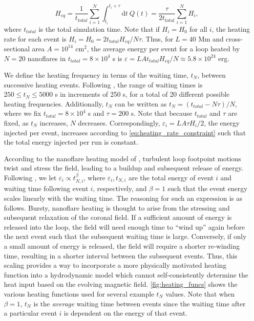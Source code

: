 \documentclass[preprint]{aastex}
\begin{document}
	\begin{equation}
		\label{eq:heating_rate_constraint}
		H_{eq} = \frac{1}{t_{total}}\sum_{i=1}^N\int_{t_i}^{t_i+\tau}\mathrm{d}t~Q(t) = \frac{\tau}{2t_{total}}\sum_{i=1}^NH_i,
	\end{equation}
	where $t_{total}$ is the total simulation time. Note that if $H_i=H_0$ for all $i$, the heating rate for each event is $H_i=H_0=2t_{total}H_{eq}/N\tau$. Thus, for $L=40$ Mm and cross-sectional area $A=10^{14}$ cm$^2$, the average energy per event for a loop heated by $N=20$ nanoflares in $t_{total}=8\times10^4$ s is $\varepsilon=LAt_{total}H_{eq}/N\approx5.8\times10^{24}$ erg.
	\par We define the heating frequency in terms of the waiting time, $t_N$, between successive heating events. Following \citet{cargill_active_2014}, the range of waiting times is $250\le t_N\le5000$ s in increments of 250 s, for a total of 20 different possible heating frequencies. Additionally, $t_N$ can be written as $t_N=(t_{total}-N\tau)/N$, where we fix $t_{total}=8\times10^4$ s and $\tau=200$ s. Note that because $t_{total}$ and $\tau$ are fixed, as $t_N$ increases, $N$ decreases. Correspondingly, $\varepsilon_i=LA\tau H_i/2$, the energy injected per event, increases according to \autoref{eq:heating_rate_constraint} such that the total energy injected per run is constant.
	\par According to the nanoflare heating model of \citet{parker_nanoflares_1988}, turbulent loop footpoint motions twist and stress the field, leading to a buildup and subsequent release of energy. Following \citet{cargill_active_2014}, we let $\varepsilon_i\propto t_{N,i}^{\beta}$, where $\varepsilon_i,t_{N,i}$ are the total energy of event $i$ and waiting time following event $i$, respectively, and $\beta=1$ such that the event energy scales linearly with the waiting time. The reasoning for such an expression is as follows. Bursty, nanoflare heating is thought to arise from the stressing and subsequent relaxation of the coronal field. If a sufficient amount of energy is released into the loop, the field will need enough time to ``wind up'' again before the next event such that the subsequent waiting time is large. Conversely, if only a small amount of energy is released, the field will require a shorter re-winding time, resulting in a shorter interval between the subsequent events. Thus, this scaling provides a way to incorporate a more physically motivated heating function into a hydrodynamic model which cannot self-consistently determine the heat input based on the evolving magnetic field. \autoref{fig:heating_funcs} shows the various heating functions used for several example $t_N$ values. Note that when $\beta=1$, $t_N$ is the \textit{average} waiting time between events since the waiting time after a particular event $i$ is dependent on the energy of that event.
\end{document}
